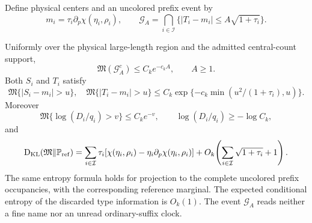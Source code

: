 Define physical centers and an uncolored prefix event by
\begin{equation}
 m_i=\tau_i\partial_p\chi(\eta_i,\rho_i),\qquad
 \mathcal G_A=\bigcap_{i\in\mathcal I}
       \{|T_i-m_i|\le A\sqrt{1+\tau_i}\}.
 \label{fp:eq:source-shell}
\end{equation}

\begin{proposition}
\label{fp:prop:source-shell}
Uniformly over the physical large-length region and the admitted
central-count support,
\begin{equation}
 \mathfrak M(\mathcal G_A^c)\le C_ke^{-c_kA},\qquad A\ge1.
 \label{fp:eq:shell-tail}
\end{equation}
Both $S_i$ and $T_i$ satisfy
\begin{equation}
 \mathfrak M\{|S_i-m_i|>u\},\quad
 \mathfrak M\{|T_i-m_i|>u\}
 \le C_k\exp\{-c_k\min(u^2/(1+\tau_i),u)\}.
 \label{fp:eq:complete-source-concentration}
\end{equation}
Moreover
\begin{equation}
 \mathfrak M\{\log(D_i/q_i)>v\}\le C_ke^{-v},\qquad
 \log(D_i/q_i)\ge-\log C_k,
 \label{fp:eq:complete-source-ratio}
\end{equation}
and
\begin{equation}
 \operatorname{D_{\mathrm{KL}}}(\mathfrak M\Vert\mathbb P_{\rm ref})
  =\sum_{i\in\mathcal I}\tau_i
       [\chi(\eta_i,\rho_i)-\eta_i\partial_p\chi(\eta_i,\rho_i)]
       +O_k\!\left(\sum_{i\in\mathcal I}\sqrt{1+\tau_i}+1\right).
 \label{fp:eq:source-entropy}
\end{equation}
The same entropy formula holds for projection to the complete
uncolored prefix occupancies, with the corresponding reference
marginal. The expected conditional entropy of the discarded type
information is $O_k(1)$. The event $\mathcal G_A$ reads neither a
fine name nor an unread ordinary-suffix clock.
\end{proposition}
